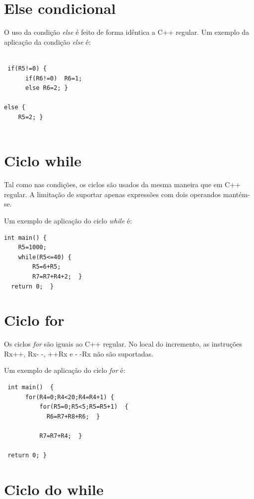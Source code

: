 \section{Else condicional}
\label{section:else condicional}


O uso da condição {\it else} é feito de forma idêntica a C++ regular. Um exemplo da aplicação da condição {\it else} é:

\begin{lstlisting}
 
 if(R5!=0) {
      if(R6!=0)  R6=1;
      else R6=2; }
      
else {
    R5=2; }
 
\end{lstlisting}

\section{Ciclo while}
\label{section:ciclo while}

Tal como nas condições, os ciclos são usados da mesma maneira que em C++ regular. A limitação de suportar apenas expressões com dois operandos mantém-se.

Um exemplo de aplicação do ciclo {\it while} é:

\begin{lstlisting}
int main() {
    R5=1000;
    while(R5<=40) { 
	    R5=6+R5;
	    R7=R7+R4+2;  }
  return 0;  }
\end{lstlisting}


\section{Ciclo for}
\label{section:ciclo for}

Os ciclos {\it for} são iguais ao C++ regular. No local do incremento, as instruções Rx++, Rx- -, ++Rx e - -Rx não são suportadas.

Um exemplo de aplicação do ciclo {\it for} é:

\begin{lstlisting}
 int main()  {
      for(R4=0;R4<20;R4=R4+1) {
	      for(R5=0;R5<5;R5=R5+1)  {
		    R6=R7+R8+R6;  }
		    
	      R7=R7+R4;  }
 
 return 0; }
\end{lstlisting}


\section{Ciclo do while}
\label{section:ciclo do while}

